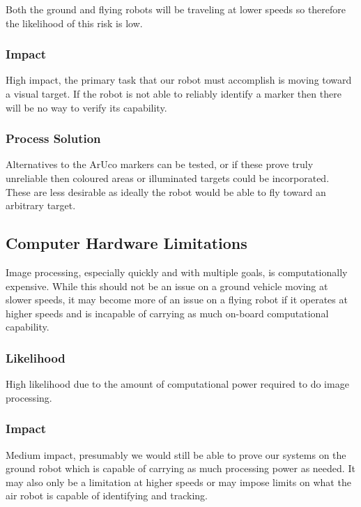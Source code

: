 \documentclass{article}
\begin{document}
		Both the ground and flying robots will be traveling at lower speeds so therefore the likelihood of this risk is low.
		
		\subsubsection{Impact}
		
		High impact, the primary task that our robot must accomplish is moving toward a visual target. If the robot is not able to reliably identify a marker then there will be no way to verify its capability.
		
		\subsubsection{Process Solution}
		
		Alternatives to the ArUco markers can be tested, or if these prove truly unreliable then coloured areas or illuminated targets could be incorporated. These are less desirable as ideally the robot would be able to fly toward an arbitrary target.
		
	\subsection{Computer Hardware Limitations}
	
	Image processing, especially quickly and with multiple goals, is computationally expensive. While this should not be an issue on a ground vehicle moving at slower speeds, it may become more of an issue on a flying robot if it operates at higher speeds and is incapable of carrying as much on-board computational capability.
	
		\subsubsection{Likelihood}

		High likelihood due to the amount of computational power required to do image processing. 
		
		\subsubsection{Impact}
		
		Medium impact, presumably we would still be able to prove our systems on the ground robot which is capable of carrying as much processing power as needed. It may also only be a limitation at higher speeds or may impose limits on what the air robot is capable of identifying and tracking. 
		
\end{document}
